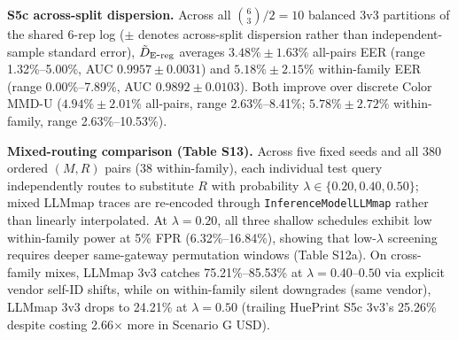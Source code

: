 \textbf{S5c across-split dispersion.} Across all $\binom{6}{3}/2 = 10$ balanced 3v3 partitions of the shared 6-rep log ($\pm$ denotes across-split dispersion rather than independent-sample standard error), $\tilde D_{\mathrm{E\mbox{-}reg}}{}$ averages $3.48\% \pm 1.63\%$ all-pairs EER (range 1.32\%--5.00\%, AUC $0.9957 \pm 0.0031$) and $5.18\% \pm 2.15\%$ within-family EER (range 0.00\%--7.89\%, AUC $0.9892 \pm 0.0103$). Both improve over discrete Color MMD-U ($4.94\% \pm 2.01\%$ all-pairs, range 2.63\%--8.41\%; $5.78\% \pm 2.72\%$ within-family, range 2.63\%--10.53\%).


\textbf{Mixed-routing comparison (Table S13).} Across five fixed seeds and all 380 ordered $(M, R)$ pairs (38 within-family), each individual test query independently routes to substitute $R$ with probability $\lambda \in \{0.20, 0.40, 0.50\}$; mixed LLMmap traces are re-encoded through \texttt{InferenceModelLLMmap} rather than linearly interpolated. At $\lambda=0.20$, all three shallow schedules exhibit low within-family power at 5\% FPR (6.32\%--16.84\%), showing that low-$\lambda$ screening requires deeper same-gateway permutation windows (Table S12a). On cross-family mixes, LLMmap 3v3 catches 75.21\%--85.53\% at $\lambda=0.40\text{--}0.50$ via explicit vendor self-ID shifts, while on within-family silent downgrades (same vendor), LLMmap 3v3 drops to 24.21\% at $\lambda=0.50$ (trailing HuePrint S5c 3v3's 25.26\% despite costing 2.66\ensuremath{\times} more in Scenario G USD).


